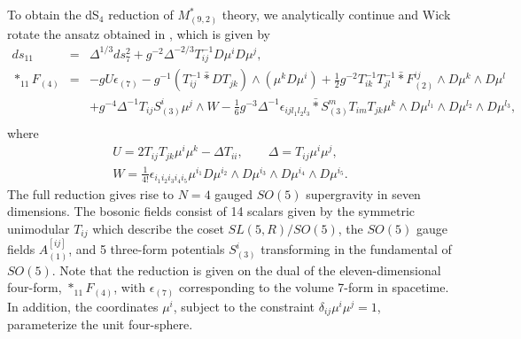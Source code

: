 \documentclass[a4paper,12pt]{article}
\newcommand{\ft}[2]{{\textstyle\frac{#1}{#2}}}
\begin{document}
To obtain the dS$_4$ reduction of $M^*_{(9,2)}$ theory, we analytically
continue and Wick rotate the ansatz obtained in \cite{Nastase,Cvetic1},
which is given by
%
\begin{eqnarray}
ds_{11}&=&\Delta^{1/3}ds_7^2+g^{-2}\Delta^{-2/3}T_{ij}^{-1}D\mu^iD\mu^j,
\nonumber\\
\ast_{11} F_{(4)}&=&-gU\epsilon_{(7)}-g^{-1}(T_{ij}^{-1}\bar{\ast} DT_{jk})
\wedge(\mu^kD\mu^i)  
+ \frac{1}{2}g^{-2}T_{ik}^{-1}T_{jl}^{-1}\bar{\ast} F^{ij}_{(2)}\wedge
D\mu^k \wedge D\mu^l\nonumber\\
&&+ g^{-4}\Delta^{-1}T_{ij}S_{(3)}^i\mu^j\wedge W 
-\frac{1}{6}g^{-3}\Delta^{-1}\epsilon_{ijl_1l_2l_3}\bar{\ast}S_{(3)}^m
T_{im}T_{jk}\mu^k \wedge D\mu^{l_1}\wedge D\mu^{l_2}\wedge D\mu^{l_3},
\nonumber\\
\end{eqnarray}
%
where
%
\begin{eqnarray}
&U=2T_{ij}T_{jk} \mu^i \mu^k -\Delta T_{ii},\qquad
\Delta=T_{ij}\mu^i \mu^j,&\nonumber\\
&W=\ft{1}{4!}\epsilon_{i_1i_2i_3i_4i_5}\mu^{i_1}D\mu^{i_2}\wedge D\mu^{i_3}
\wedge D\mu^{i_4}\wedge D\mu^{i_5}.&
\end{eqnarray}
%
The full reduction gives rise to $N=4$ gauged $SO(5)$ supergravity in
seven dimensions.  The bosonic fields consist of 14 scalars given by the
symmetric unimodular $T_{ij}$ which describe the coset $SL(5,R)/SO(5)$,
the $SO(5)$ gauge fields $A^{[ij]}_{(1)}$, and 5 three-form potentials
$S^i_{(3)}$ transforming in the fundamental of $SO(5)$.
Note that the reduction is given on the dual of the eleven-dimensional
four-form, $\ast_{11} F_{(4)}$, with $\epsilon_{(7)}$ corresponding to the
volume 7-form in spacetime.  In addition, the coordinates $\mu^i$,
subject to the constraint $\delta_{ij}\mu^i\mu^j=1$, parameterize the
unit four-sphere.
\end{document}
